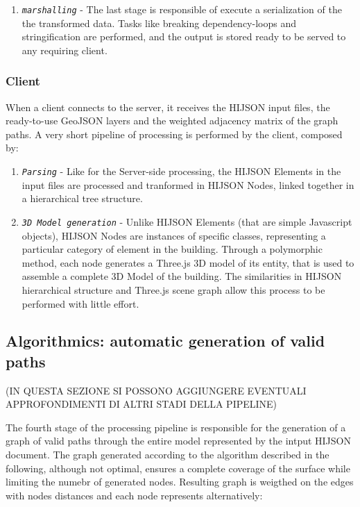 \documentclass{sig-alternate}
\begin{document}
\begin{enumerate}
\item
  \textit{\texttt{marshalling}} - The last stage is responsible of execute a serialization of the the transformed data. Tasks like breaking dependency-loops and stringification are performed, and the output is stored ready to be served to any requiring client.
\end{enumerate}

\subsubsection{Client}\label{client}

When a client connects to the server, it receives the HIJSON input
files, the ready-to-use GeoJSON layers and the weighted adjacency matrix
of the graph paths. A very short pipeline of processing is performed by
the client, composed by: 
\begin{enumerate}
\item
  \textit{\texttt{Parsing}} - Like for the Server-side processing, the HIJSON Elements in the input files are processed and tranformed in HIJSON Nodes, linked together in a hierarchical tree structure. 
\item
\textit{\texttt{3D Model generation}} - Unlike HIJSON Elements (that are simple Javascript objects), HIJSON Nodes are instances of specific classes, representing a particular category of element in the building. Through a polymorphic method, each node generates a Three.js 3D model of its entity, that is used to assemble a complete 3D Model of the building. The similarities in HIJSON hierarchical structure and Three.js scene graph allow this process to be performed with little effort.
\end{enumerate}

\subsection{Algorithmics: automatic generation of valid paths}\label{algorithmics-automatic-generation-of-valid-paths}

(IN QUESTA SEZIONE SI POSSONO AGGIUNGERE EVENTUALI APPROFONDIMENTI DI
ALTRI STADI DELLA PIPELINE)

The fourth stage of the processing pipeline is responsible for the generation of a graph of valid paths through the entire model represented by the intput HIJSON document. The graph generated according to the algorithm described in the following, although not optimal, ensures a complete coverage of the surface while limiting the numebr of generated nodes. Resulting graph is weigthed on the edges with nodes distances and each node represents alternatively:
\end{document}
